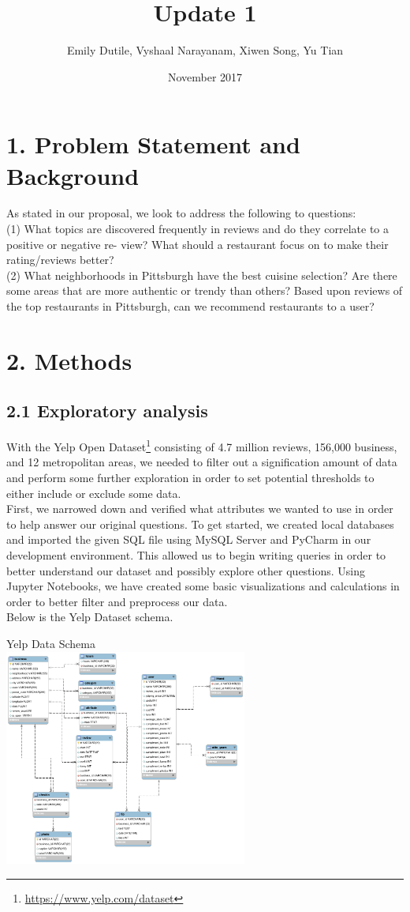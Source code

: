 \documentclass{neu_handout}
\title{Update 1}
\author{Emily Dutile, Vyshaal Narayanam, Xiwen Song, Yu Tian}
\date{November 2017}
\begin{document}
\section*{1. Problem Statement and Background}
As stated in our proposal, we look to address the following to questions:\\

(1) What topics are discovered frequently in reviews and do they correlate to a positive or negative re- view? What should a restaurant focus on to make their rating/reviews better? \\

(2) What neighborhoods in Pittsburgh have the best cuisine selection? Are there some areas that are more authentic or trendy than others? Based upon reviews of the top restaurants in Pittsburgh, can we recommend restaurants to a user?

\section*{2. Methods}
\subsection*{2.1 Exploratory analysis}
With the Yelp Open Dataset\footnote{\url{https://www.yelp.com/dataset}} consisting of 4.7 million reviews, 156,000 business, and 12 metropolitan areas, we needed to filter out a signification amount of data and perform some further exploration in order to set potential thresholds to either include or exclude some data.\\
First, we narrowed down and verified what attributes we wanted to use in order to help answer our original questions. To get started, we created local databases and imported the given SQL file using MySQL Server and PyCharm in our development environment. This allowed us to begin writing queries in order to better understand our dataset and possibly explore other questions. Using Jupyter Notebooks, we have created some basic visualizations and calculations in order to better filter and preprocess our data.\\

Below is the Yelp Dataset schema.

\begin{center}
Yelp Data Schema\\
\includegraphics[width=80mm,scale=0.5]{schema}\\
\end{center}
\end{document}
